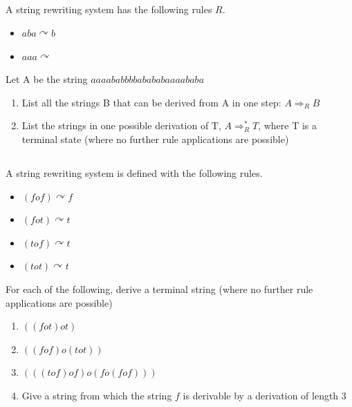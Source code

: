 \documentclass[twocolumn]{article}
\begin{document}
\subsection{}

    A string rewriting system has the following rules $R$.

    \begin{itemize}
        \item $aba \curvearrowright b$
        \item $aaa \curvearrowright $
    \end{itemize}

    Let A be the string $aaaababbbbabababaaaababa$

    \begin{enumerate}
        \item List all the strings B that can be derived from A in one step: $A \Rightarrow_R B$
        \item List the strings in one possible derivation of T, $A \Rightarrow^*_R T$, where T is a terminal state (where no further rule applications are possible)
    \end{enumerate}

\subsection{}

    A string rewriting system is defined with the following rules.

    \begin{multicols}{2}
    \begin{itemize}
        \item $(fof) \curvearrowright f$
        \item $(fot) \curvearrowright t$
        \item $(tof) \curvearrowright t$
        \item $(tot) \curvearrowright t$
    \end{itemize}
\end{multicols}

    For each of the following, derive a terminal string (where no further rule applications are possible)

    \begin{enumerate}
        \item $((fot)ot)$
        \item $((fof)o(tot))$
        \item $(((tof)of)o(fo(fof)))$
        \item Give a string from which the string $f$ is derivable by a derivation of length 3
    \end{enumerate}
\end{document}
